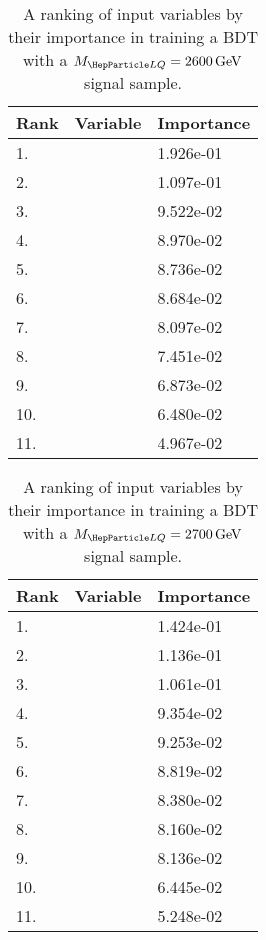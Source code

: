 \begin{table}[H]
	\caption{A ranking of input variables by their importance in training a BDT with a $\MLQ = \SI{2600}{GeV}$ signal sample.}
	\begin{center}
		\begin{tabular}{lll} \hline \hline
			Rank & Variable & Importance  \\ \hline
			1. & \MujTwo & 1.926e-01 \\
			2. & \MujOne & 1.097e-01 \\
			3. & \Muujj & 9.522e-02 \\
			4. & \ptof{\PjTwo} & 8.970e-02 \\
			5. & \Muu & 8.736e-02 \\
			6. & \ptof{\PjOne} & 8.684e-02 \\
			7. & \ptof{\PmuTwo} & 8.097e-02 \\
			8. & \DRof{\PmuOne+\PmuTwo}{\PjOne} & 7.451e-02 \\
			9. & \ST & 6.873e-02 \\
			10. & \ptof{\PmuOne} & 6.480e-02 \\
			11. & \MET & 4.967e-02 \\ \hline \hline
		\end{tabular}
		\label{tab:bdtRank2600}
	\end{center}
\end{table}

\begin{table}[H]
	\caption{A ranking of input variables by their importance in training a BDT with a $\MLQ = \SI{2700}{GeV}$ signal sample.}
	\begin{center}
		\begin{tabular}{lll} \hline \hline
			Rank & Variable & Importance  \\ \hline
			1. & \MujTwo & 1.424e-01 \\
			2. & \Muujj & 1.136e-01 \\
			3. & \ST & 1.061e-01 \\
			4. & \MujOne & 9.354e-02 \\
			5. & \Muu & 9.253e-02 \\
			6. & \ptof{\PmuTwo} & 8.819e-02 \\
			7. & \DRof{\PmuOne+\PmuTwo}{\PjOne} & 8.380e-02 \\
			8. & \ptof{\PjOne} & 8.160e-02 \\
			9. & \ptof{\PjTwo} & 8.136e-02 \\
			10. & \ptof{\PmuOne} & 6.445e-02 \\
			11. & \MET & 5.248e-02 \\ \hline \hline
		\end{tabular}
		\label{tab:bdtRank2700}
	\end{center}
\end{table}

